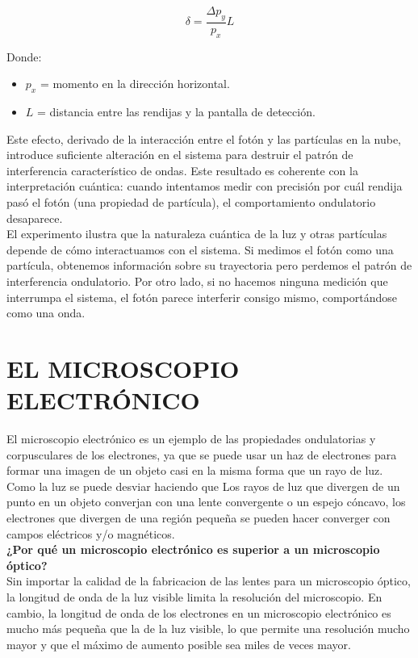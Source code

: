 \documentclass[a4paper]{article}
\begin{document}
    \begin{equation}
        \delta = \frac{\Delta p_y}{p_x} L
    \end{equation}

    \indent Donde: \\

      \begin{itemize} [itemsep = -1.5em, topsep = 0em, leftmargin = 1cm]
        \item $p_x$ = momento en la dirección horizontal. \\
        \item $L$ = distancia entre las rendijas y la pantalla de detección. \\
      \end{itemize}

    \indent Este efecto, derivado de la interacción entre el fotón y las partículas en la nube, introduce suficiente alteración en el sistema para destruir el patrón de interferencia característico de ondas. Este resultado es coherente con la interpretación cuántica: cuando intentamos medir con precisión por cuál rendija pasó el fotón (una propiedad de partícula), el comportamiento ondulatorio desaparece.\\

    \indent El experimento ilustra que la naturaleza cuántica de la luz y otras partículas depende de cómo interactuamos con el sistema. Si medimos el fotón como una partícula, obtenemos información sobre su trayectoria pero perdemos el patrón de interferencia ondulatorio. Por otro lado, si no hacemos ninguna medición que interrumpa el sistema, el fotón parece interferir consigo mismo, comportándose como una onda.


\section{EL MICROSCOPIO ELECTRÓNICO}

    \indent El microscopio electrónico es un ejemplo de las propiedades ondulatorias y corpusculares de los electrones, ya que se puede usar un haz de electrones para formar una imagen de un objeto casi en la misma forma que un rayo de luz. Como la luz se puede desviar haciendo que Los rayos de luz que divergen de un punto en un objeto converjan con una lente convergente o un espejo cóncavo, los electrones que divergen de una región pequeña se pueden hacer converger con campos eléctricos y/o magnéticos.\\
    \indent \textbf{¿Por qué un microscopio electrónico es superior a un microscopio óptico?}\\
    \indent Sin importar la calidad de la fabricacion de las lentes para un microscopio óptico, la longitud de onda de la luz visible limita la resolución del microscopio. En cambio, la longitud de onda de los electrones en un microscopio electrónico es mucho más pequeña que la de la luz visible, lo que permite una resolución mucho mayor y que el máximo de aumento posible sea miles de veces mayor.\\
\end{document}
